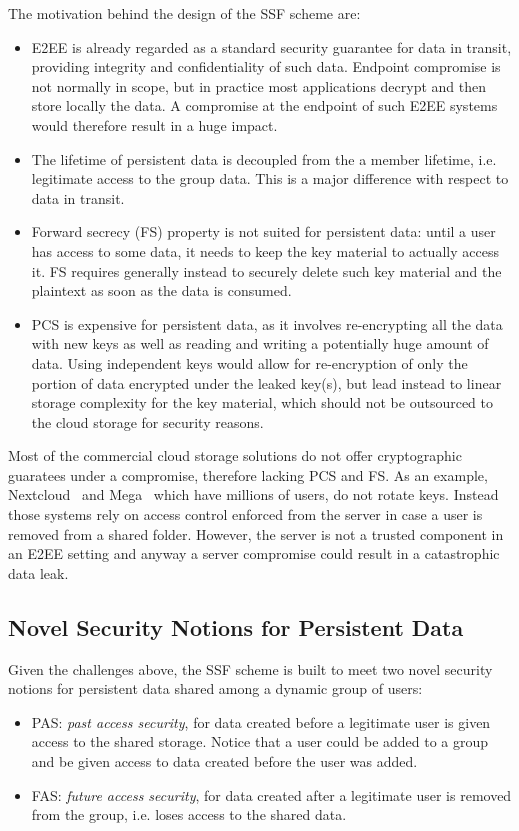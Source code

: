 The motivation behind the design of the SSF scheme are:
\begin{itemize}
    \item E2EE is already regarded as a standard security guarantee for data in transit, providing integrity and confidentiality of such data. Endpoint compromise is not normally in scope, but in practice most applications decrypt and then store locally the data. A compromise at the endpoint of such E2EE systems would therefore result in a huge impact.
    \item The lifetime of persistent data is decoupled from the a member lifetime, i.e. legitimate access to the group data. This is a major difference with respect to data in transit.
    \item Forward secrecy (FS) property is not suited for persistent data: until a user has access to some data, it needs to keep the key material to actually access it. FS requires generally instead to securely delete such key material and the plaintext as soon as the data is consumed. 
    \item PCS is expensive for persistent data, as it involves re-encrypting all the data with new keys as well as reading and writing a potentially huge amount of data. Using independent keys would allow for re-encryption of only the portion of data encrypted under the leaked key(s), but lead instead to linear storage complexity for the key material, which should not be outsourced to the cloud storage for security reasons.
\end{itemize}

Most of the commercial cloud storage solutions do not offer cryptographic guaratees under a compromise,
therefore lacking PCS and FS. As an example, Nextcloud~\cite{2017NextcloudE2EEnc} and Mega~\cite{Mega}
which have millions of users, do not rotate keys. 
Instead those systems rely on access control enforced from the server
in case a user is removed from a shared folder.
However, the server is not a trusted component in an E2EE setting
and anyway a server compromise could result in a catastrophic data leak.

\subsection{Novel Security Notions for Persistent Data}

Given the challenges above, the SSF scheme is built to meet two 
novel security notions for persistent data shared among a dynamic 
group of users:
\begin{itemize}
    \item PAS: \textit{past access security}, for data created before a legitimate user is given access to the shared storage. Notice that a user could be added to a group and be given access to data created before the user was added.
    \item FAS: \textit{future access security}, for data created after a legitimate user is removed from the group, i.e. loses access to the shared data.
\end{itemize}


